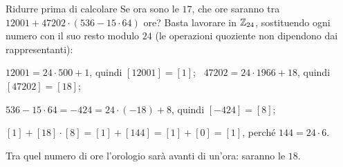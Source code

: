 \begin{esempio}{Ridurre prima di calcolare}
    Se ora sono le $17$, che ore saranno tra $12001 + 47202 \cdot (536 - 15 \cdot 64)$ ore? Basta lavorare in $\mathbb{Z}_{24}$, sostituendo ogni numero con il
    suo resto modulo $24$ (le operazioni quoziente non dipendono dai rappresentanti):
    \begin{passi}
        \item $12001 = 24 \cdot 500 + 1$, quindi $[12001] = [1]$; \ $47202 = 24 \cdot 1966 + 18$, quindi $[47202] = [18]$;
        \item $536 - 15 \cdot 64 = -424 = 24 \cdot (-18) + 8$, quindi $[-424] = [8]$;
        \item $[1] + [18] \cdot [8] = [1] + [144] = [1] + [0] = [1]$, perché $144 = 24 \cdot 6$.
    \end{passi}
    Tra quel numero di ore l'orologio sarà avanti di un'ora: saranno le $18$.
\end{esempio}

